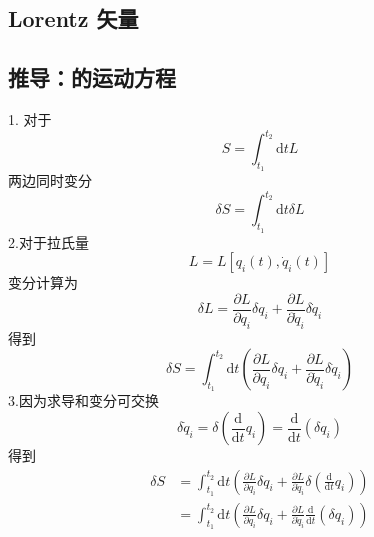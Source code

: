 \subsection{}














\subsection{ Lorentz 矢量}

\newpage
\subsection{推导：的运动方程}
1.
对于
\begin{equation}
     S=\int_{t_1}^{t_2}{\mathrm{d}t}L
\end{equation}
两边同时变分
\begin{equation}
     \delta S=\int_{t_1}^{t_2}{\mathrm{d}t}\delta L
\end{equation}
2.对于拉氏量
\begin{equation}
    L=L[q_i(t),\dot{q}_i(t)]
\end{equation}
变分计算为
\begin{equation}
     \delta L=\frac{\partial L}{\partial q_i}\delta q_i+\frac{\partial L}{\partial \dot{q}_i}\delta \dot{q}_i
\end{equation}
得到
\begin{equation}
    \delta S=\int_{t_1}^{t_2}{\mathrm{d}t}\left( \frac{\partial L}{\partial q_i}\delta q_i+\frac{\partial L}{\partial \dot{q}_i}\delta \dot{q}_i \right) 
\end{equation}
3.因为求导和变分可交换
\begin{equation}
     \delta \dot{q}_i=\delta \left( \frac{\mathrm{d}}{\mathrm{d}t}q_i \right) =\frac{\mathrm{d}}{\mathrm{d}t}\left( \delta q_i \right) 
\end{equation}
得到
\begin{equation}
     \begin{aligned}
         \delta S&=\int_{t_1}^{t_2}{\mathrm{d}t}\left( \frac{\partial L}{\partial q_i}\delta q_i+\frac{\partial L}{\partial \dot{q}_i}\delta \left( \frac{\mathrm{d}}{\mathrm{d}t}q_i \right) \right) 
\\
&=\int_{t_1}^{t_2}{\mathrm{d}t}\left( \frac{\partial L}{\partial q_i}\delta q_i+\frac{\partial L}{\partial \dot{q}_i}\frac{\mathrm{d}}{\mathrm{d}t}\left( \delta q_i \right) \right) 
     \end{aligned}
\end{equation}

